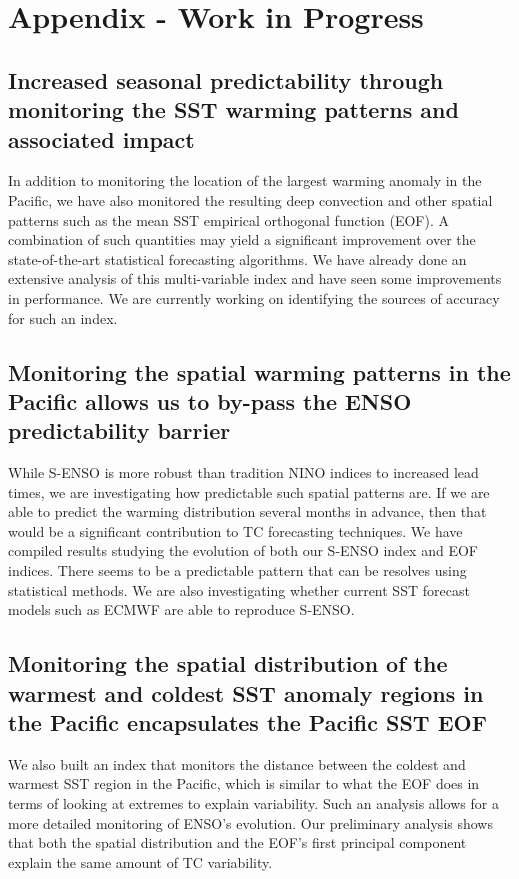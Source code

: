 \section{Appendix - Work in Progress}
\subsection{Increased seasonal predictability through monitoring the SST warming patterns and associated impact}
In addition to monitoring the location of the largest warming anomaly in the Pacific, we have also monitored the resulting deep convection and other spatial patterns such as the mean SST empirical orthogonal function (EOF). A combination of such quantities may yield a significant improvement over the state-of-the-art statistical forecasting algorithms.
We have already done an extensive analysis of this multi-variable index and have seen some improvements in performance. We are currently working on identifying the sources of accuracy for such an index.

\subsection{Monitoring the spatial warming patterns in the Pacific allows us to by-pass the ENSO predictability barrier}
While S-ENSO is more robust than tradition NINO indices to increased lead times, we are investigating how predictable such spatial patterns are. If we are able to predict the warming distribution several months in advance, then that would be a significant contribution to TC forecasting techniques. 
We have compiled results studying the evolution of both our S-ENSO index and EOF indices. There seems to be a predictable pattern that can be resolves using statistical methods. We are also investigating whether current SST forecast models such as ECMWF are able to reproduce S-ENSO.

\subsection{Monitoring the spatial distribution of the warmest and coldest SST anomaly regions in the Pacific encapsulates the Pacific SST EOF}
We also built an index that monitors the distance between the coldest and warmest SST region in the Pacific, which is similar to what the EOF does in terms of looking at extremes to explain variability. Such an analysis allows for a more detailed monitoring of ENSO's evolution. Our preliminary analysis shows that both the spatial distribution and the EOF's first principal component explain the same amount of TC variability.

\newpage